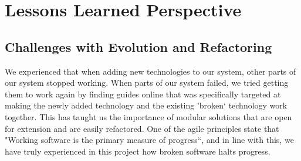 \section{Lessons Learned Perspective}






\subsection{Challenges with Evolution and Refactoring}

We experienced that when adding new technologies to our system, other parts of our system stopped working. 
When parts of our system failed, we tried getting them to work again by finding guides online that was specifically targeted at making the newly added technology and the existing 'broken` technology work together. 
This has taught us the importance of modular solutions that are open for extension and are easily refactored. 
One of the agile principles state that "Working software is the primary measure of progress``, and in line with this, we have truly experienced in this project how broken software halts progress. 




